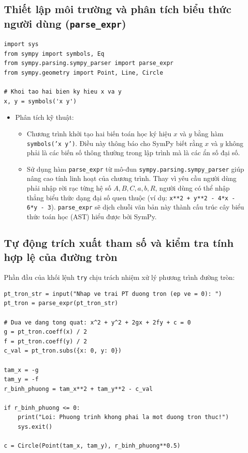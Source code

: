 \documentclass[12pt,a4paper]{article}
\begin{document}
\subsection[Thiết lập môi trường và phân tích biểu thức người dùng]{Thiết lập môi trường và phân tích biểu thức người dùng (\texttt{parse\_expr})}
\begin{lstlisting}
import sys
from sympy import symbols, Eq
from sympy.parsing.sympy_parser import parse_expr
from sympy.geometry import Point, Line, Circle

# Khoi tao hai bien ky hieu x va y
x, y = symbols('x y')
\end{lstlisting}

\begin{itemize}
    \item Phân tích kỹ thuật:
    \begin{itemize}
        \item Chương trình khởi tạo hai biến toán học ký hiệu $x$ và $y$ bằng hàm \texttt{symbols('x y')}. Điều này thông báo cho SymPy biết rằng $x$ và $y$ không phải là các biến số thông thường trong lập trình mà là các ẩn số đại số.
        \item Sử dụng hàm \texttt{parse\_expr} từ mô-đun \texttt{sympy.parsing.sympy\_parser} giúp nâng cao tính linh hoạt của chương trình. Thay vì yêu cầu người dùng phải nhập rời rạc từng hệ số $A, B, C, a, b, R$, người dùng có thể nhập thẳng biểu thức dạng đại số quen thuộc (ví dụ: \texttt{x**2 + y**2 - 4*x - 6*y - 3}). \texttt{parse\_expr} sẽ dịch chuỗi văn bản này thành cấu trúc cây biểu thức toán học (AST) hiểu được bởi SymPy.
    \end{itemize}
\end{itemize}

\subsection{Tự động trích xuất tham số và kiểm tra tính hợp lệ của đường tròn}

Phần đầu của khối lệnh \texttt{try} chịu trách nhiệm xử lý phương trình đường tròn:

\begin{lstlisting}
pt_tron_str = input("Nhap ve trai PT duong tron (ep ve = 0): ")
pt_tron = parse_expr(pt_tron_str)

# Dua ve dang tong quat: x^2 + y^2 + 2gx + 2fy + c = 0
g = pt_tron.coeff(x) / 2
f = pt_tron.coeff(y) / 2
c_val = pt_tron.subs({x: 0, y: 0})

tam_x = -g
tam_y = -f
r_binh_phuong = tam_x**2 + tam_y**2 - c_val

if r_binh_phuong <= 0:
    print("Loi: Phuong trinh khong phai la mot duong tron thuc!")
    sys.exit()

c = Circle(Point(tam_x, tam_y), r_binh_phuong**0.5)
\end{lstlisting}
\end{document}
